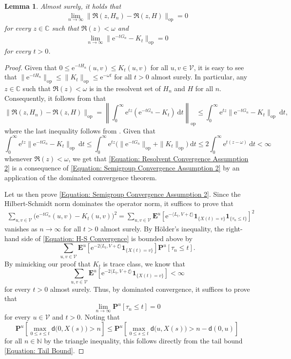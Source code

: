 \documentclass{amsart}
\numberwithin{equation}{section}
\newtheorem{lemma}[theorem]{Lemma}
\theoremstyle{definition}
\newcommand\om{\omega}
\renewcommand\d{~\mathrm d}
\newcommand\mbb{\mathbb}
\newcommand\mbf{\mathbf}
\newcommand\mf{\mathfrak}
\newcommand\mr{\mathrm}
\newcommand\ms{\mathscr}
\newcommand\msf{\mathsf}
\begin{document}
\begin{lemma}
Almost surely, it holds that
\begin{align}
\label{Equation: Resolvent Convergence Assumption 2}
\lim_{n\to\infty}\|\mf R(z,H_n)-\mf R(z,H)\|_{\mr{op}}=0
\end{align}
for every $z\in\mbb C$ such that $\Re(z)<\om$ and
\begin{align}
\label{Equation: Semigroup Convergence Assumption 2}
\lim_{n\to\infty}\|\mr e^{-t G_n}-K_t\|_{\mr{op}}=0
\end{align}
for every $t>0$.
\end{lemma}
\begin{proof}
Given that $0\leq\mr e^{-tH_n}(u,v)\leq K_t(u,v)$ for all $u,v\in\ms V$,
it is easy to see that $\|\mr e^{-tH_n}\|_{\mr{op}}\leq\|K_t\|_{\mr{op}}\leq\mr e^{-\om t}$
for all $t>0$ almost surely. In particular, any $z\in\mbb C$ such that $\Re(z)<\om$
is in the resolvent set of $H_n$ and $H$ for all $n$. Consequently, it follows
from \cite[Chapter II, Theorem 1.10]{EngelNagel} that
\[\|\mf R(z,H_n)-\mf R(z,H)\|_{\mr{op}}=\left\|\int_0^\infty\mr e^{tz}(\mr e^{-t G_n}-K_t)\d t\right\|_{\mr{op}}
\leq\int_0^\infty\mr e^{t z}\|\mr e^{-t G_n}-K_t\|_{\mr{op}}\d t,\]
where the last inequality follows from \cite[Chapter II, Theorem 4 (ii)]{DU77}.
Given that
\[\int_0^\infty\mr e^{t z}\|\mr e^{-t G_n}-K_t\|_{\mr{op}}\d t\leq\int_0^\infty\mr e^{t z}\big(\|\mr e^{-t G_n}\|_{\mr{op}}+\|K_t\|_{\mr{op}}\big)\d t
\leq2\int_0^\infty\mr e^{t(z-\om)}\d t<\infty\]
whenever $\Re(z)<\om$, we get that \eqref{Equation: Resolvent Convergence Assumption 2} is
a consequence of \eqref{Equation: Semigroup Convergence Assumption 2} by an application of the dominated convergence theorem.

Let us then prove \eqref{Equation: Semigroup Convergence Assumption 2}.
Since the Hilbert-Schmidt norm dominates the operator norm, it suffices to prove that
\begin{align}
\label{Equation: H-S Convergence}
\sum_{u,v\in\ms V}\big(\mr e^{-tG_n}(u,v)-K_t(u,v)\big)^2=\sum_{u,v\in\ms V}\mbf E^u\left[\mr e^{-\langle L_t,V+\xi\rangle}\mbf 1_{\{X(t)=v\}}\mbf 1_{\{\tau_n\leq t\}}\right]^2
\end{align}
vanishes as $n\to\infty$ for all $t>0$ almost surely. By H\"older's inequality,
the right-hand side of \eqref{Equation: H-S Convergence} is bounded above by
\[\sum_{u,v\in\ms V}\mbf E^u\left[\mr e^{-2\langle L_t,V+\xi\rangle}\mbf 1_{\{X(t)=v\}}\right]\mbf P^u[\tau_n\leq t].\]
By mimicking our proof that $K_t$ is trace class, we know that
\[\sum_{u,v\in\ms V}\mbf E^u\left[\mr e^{-2\langle L_t,V+\xi\rangle}\mbf 1_{\{X(t)=v\}}\right]<\infty\]
for every $t>0$ almost surely. Thus, by dominated convergence, it suffices to prove that
\[\lim_{n\to\infty}\mbf P^u[\tau_n\leq t]=0\]
for every $u\in\ms V$ and $t>0$. Noting that
\[\mbf P^u\left[\max_{0\leq s\leq t} \msf d\big(0,X(s)\big)> n\right]
\leq\mbf P^u\left[\max_{0\leq s\leq t} \msf d\big(u,X(s)\big)> n-\msf d(0,u)\right]\]
for all $n\in\mbb N$ by the triangle inequality,
this follows directly from
the tail bound \eqref{Equation: Tail Bound}.
\end{proof}
\end{document}

